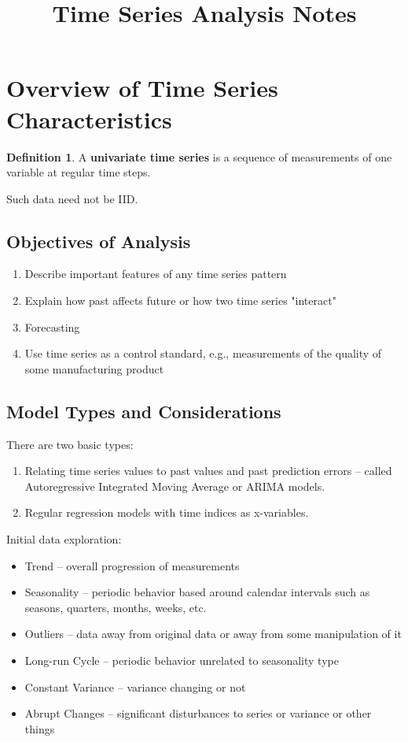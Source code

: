 \documentclass[12pt]{article}
\title{Time Series Analysis Notes}
\theoremstyle{definition}
\newtheorem{defn}[thm]{Definition}
\begin{document}
\maketitle
\section{Overview of Time Series Characteristics}
\begin{defn}
A \textbf{univariate time series} is a sequence of measurements of one variable at regular time steps.
\end{defn} 
\noindent Such data need not be IID.

\subsection{Objectives of Analysis}
\begin{enumerate}
    \item Describe important features of any time series pattern
    \item Explain how past affects future or how two time series "interact"
    \item Forecasting
    \item Use time series as a control standard, e.g., measurements of the quality of some manufacturing product
\end{enumerate}

\subsection{Model Types and Considerations}
There are two basic types:
\begin{enumerate}
    \item Relating time series values to past values and past prediction errors -- called Autoregressive Integrated Moving Average or ARIMA models.
    \item Regular regression models with time indices as x-variables.
\end{enumerate}

\noindent Initial data exploration:
\begin{itemize}
    \item Trend -- overall progression of measurements
    \item Seasonality -- periodic behavior based around calendar intervals such as seasons, quarters, months, weeks, etc.
    \item Outliers -- data away from original data or away from some manipulation of it
    \item Long-run Cycle -- periodic behavior unrelated to seasonality type
    \item Constant Variance -- variance changing or not
    \item Abrupt Changes -- significant disturbances to series or variance or other things
\end{itemize}
\end{document}
